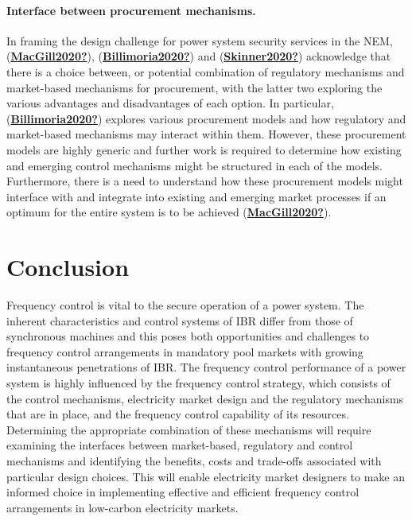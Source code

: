 \documentclass[12pt,a4paper,]{report}
\begin{document}
\hypertarget{interface-between-procurement-mechanisms.}{%
\paragraph{Interface between procurement
mechanisms.}\label{interface-between-procurement-mechanisms.}}

In framing the design challenge for power system security services in
the NEM, (\protect\hyperlink{ref-MacGill2020}{\textbf{MacGill2020?}}),
(\protect\hyperlink{ref-Billimoria2020}{\textbf{Billimoria2020?}}) and
(\protect\hyperlink{ref-Skinner2020}{\textbf{Skinner2020?}}) acknowledge
that there is a choice between, or potential combination of regulatory
mechanisms and market-based mechanisms for procurement, with the latter
two exploring the various advantages and disadvantages of each option.
In particular,
(\protect\hyperlink{ref-Billimoria2020}{\textbf{Billimoria2020?}})
explores various procurement models and how regulatory and market-based
mechanisms may interact within them. However, these procurement models
are highly generic and further work is required to determine how
existing and emerging control mechanisms might be structured in each of
the models. Furthermore, there is a need to understand how these
procurement models might interface with and integrate into existing and
emerging market processes if an optimum for the entire system is to be
achieved (\protect\hyperlink{ref-MacGill2020}{\textbf{MacGill2020?}}).

\hypertarget{conclusion}{%
\section{Conclusion}\label{conclusion}}

Frequency control is vital to the secure operation of a power system.
The inherent characteristics and control systems of IBR differ from
those of synchronous machines and this poses both opportunities and
challenges to frequency control arrangements in mandatory pool markets
with growing instantaneous penetrations of IBR. The frequency control
performance of a power system is highly influenced by the frequency
control strategy, which consists of the control mechanisms, electricity
market design and the regulatory mechanisms that are in place, and the
frequency control capability of its resources. Determining the
appropriate combination of these mechanisms will require examining the
interfaces between market-based, regulatory and control mechanisms and
identifying the benefits, costs and trade-offs associated with
particular design choices. This will enable electricity market designers
to make an informed choice in implementing effective and efficient
frequency control arrangements in low-carbon electricity markets.
\end{document}
